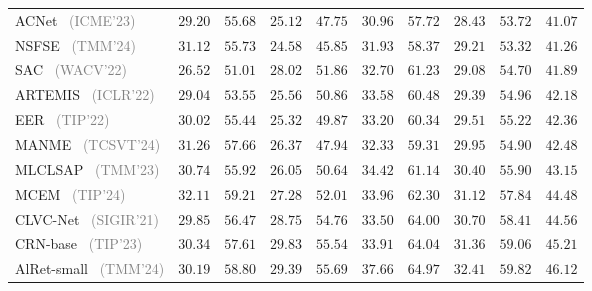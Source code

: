 \begin{table*}
\begin{tabular}{l|cc|cc|cc|cc|c}
    ACNet~\cite{li2023acnet} \footnotesize{\textcolor{gray}{(ICME'23)}} & $29.20$ & $55.68$ & $25.12$ & $47.75$ & $30.96$ & $57.72$ & $28.43$ & $53.72$ & $41.07$ \\
    NSFSE~\cite{wang2024NSFSE} \footnotesize{\textcolor{gray}{(TMM'24)}} & $31.12$ & $55.73$ & $24.58$ & $45.85$ & $31.93$ & $58.37$ & $29.21$ & $53.32$ & $41.26$ \\
    SAC~\cite{jandial2022sac} \footnotesize{\textcolor{gray}{(WACV'22)}} & $26.52$ & $51.01$ & $28.02$ & $51.86$ & $32.70$ & $61.23$ & $29.08$ & $54.70$ & $41.89$ \\
    ARTEMIS~\cite{delmas2022artemis} \footnotesize{\textcolor{gray}{(ICLR'22)}} & $29.04$ & $53.55$ & $25.56$ & $50.86$ & $33.58$ & $60.48$ & $29.39$ & $54.96$ & $42.18$ \\
    EER~\cite{zhang2022eer} \footnotesize{\textcolor{gray}{(TIP'22)}} & $30.02$ & $55.44$ & $25.32$ & $49.87$ & $33.20$ & $60.34$ & $29.51$ & $55.22$ & $42.36$ \\
    MANME~\cite{li2023manme} \footnotesize{\textcolor{gray}{(TCSVT'24)}} & $31.26$ & $57.66$ & $26.37$ & $47.94$ & $32.33$ & $59.31$ & $29.95$ & $54.90$ & $42.48$ \\
    MLCLSAP~\cite{zhang2023MLCLSAP} \footnotesize{\textcolor{gray}{(TMM'23)}} & $30.74$ & $55.92$ & $26.05$ & $50.64$ & $34.42$ & $61.14$ & $30.40$ & $55.90$ & $43.15$ \\
    MCEM~\cite{zhang2024mcem} \footnotesize{\textcolor{gray}{(TIP'24)}} & $32.11$ & $59.21$ & $27.28$ & $52.01$ & $33.96$ & $62.30$ & $31.12$ & $57.84$ & $44.48$ \\
    CLVC-Net~\cite{wen2021clvcnet} \footnotesize{\textcolor{gray}{(SIGIR'21)}} & $29.85$ & $56.47$ & $28.75$ & $54.76$ & $33.50$ & $64.00$ & $30.70$ & $58.41$ & $44.56$ \\
    CRN-base~\cite{yang2023crn} \footnotesize{\textcolor{gray}{(TIP'23)}} & $30.34$ & $57.61$ & $29.83$ & $55.54$ & $33.91$ & $64.04$ & $31.36$ & $59.06$ & $45.21$ \\
    AlRet-small~\cite{xu2024alret} \footnotesize{\textcolor{gray}{(TMM'24)}} & $30.19$ & $58.80$ & $29.39$ & $55.69$ & $37.66$ & $64.97$ & $32.41$ & $59.82$ & $46.12$ \\

\end{tabular}
\end{table*}
